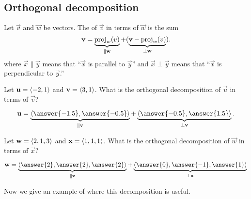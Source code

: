 \documentclass{ximera}
\begin{document}
\subsection{Orthogonal decomposition}

\begin{definition}
Let $\vec v$ and $\vec w$ be vectors. The  of $\vec v$ in terms of $\vec{w}$ is the sum
\[
\mathbf v = \underbrace{\operatorname{proj}_w(v)}_{\parallel \mathbf w} +  (\underbrace{\mathbf v-\operatorname{proj}_w(v)}_{\perp \mathbf w}).
\]
where $\vec{x} \parallel \vec{y}$ means that ``$\vec{x}$ is parallel
to $\vec{y}$'' and $\vec{x} \perp\vec{y}$ means that ``$\vec{x}$ is
perpendicular to $\vec{y}$.''
\end{definition}

\begin{question}
Let $\mathbf u = \left\langle -2,1\right\rangle$ and $\mathbf v = \left\langle 3,1\right\rangle$.  What is the
orthogonal decomposition of $\vec{u}$ in terms of $\vec{v}$?
\begin{prompt}
\[
\vec u= \underbrace{\vector{\answer{-1.5},\answer{-0.5}}}_{\parallel \vec v} + \underbrace{\vector{\answer{-0.5},\answer{1.5}}}_{\perp \vec v}.
\]
\end{prompt}
\begin{question}
  Let $\mathbf w =\left\langle 2,1,3\right\rangle$ and $\mathbf x  =\left\langle  1,1,1\right\rangle$. What is the
  orthogonal decomposition of $\vec{w}$ in terms of $\vec{x}$?
  \begin{prompt}
  \[
  \vec w  = \underbrace{\vector{\answer{2},\answer{2},\answer{2}}}_{\parallel \vec x} + \underbrace{\vector{ \answer{0},\answer{-1},\answer{1}}}_{\perp\vec x}
  \]
  \end{prompt}
\end{question}
\end{question}


Now we give an example of where this decomposition is useful.
\end{document}
